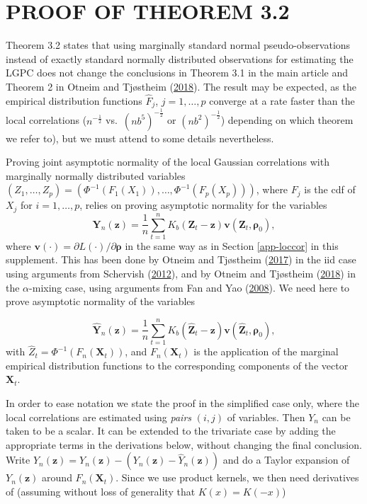 \documentclass[
  12pt,
  letterpaper]{article}
\numberwithin{equation}{section}
\newcommand{\X}{\bm{X}}
\newcommand{\Z}{\bm{Z}}
\newcommand{\z}{\bm{z}}
\newcommand{\hZ}{\widehat{\bm{Z}}}
\newcommand{\hnZ}{\widehat{Z}}
\newcommand{\hY}{\widehat{Y}}
\newcommand{\fY}{\bm{Y}}
\newcommand{\hfY}{\widehat{\bm{Y}}}
\newcommand{\fv}{\bm{v}}
\newcommand{\frho}{\bm{\rho}}
\begin{document}
\hypertarget{proofpseudo}{%
\section{PROOF OF THEOREM 3.2}\label{proofpseudo}}

Theorem 3.2 states that using marginally standard normal pseudo-observations instead of exactly standard normally distributed observations for estimating the LGPC does not change the conclusions in Theorem 3.1 in the main article and Theorem 2 in Otneim and Tjøstheim (\protect\hyperlink{ref-otneim2017conditional}{2018}). The result may be expected, as the empirical distribution functions \(\widehat{F}_j\), \(j = 1,\ldots,p\) converge at a rate faster than the local correlations (\(n^{-\frac{1}{2}}\) vs.~\((nb^5)^{-\frac{1}{2}}\) or \((nb^2)^{-\frac{1}{2}}\)) depending on which theorem we refer to), but we must attend to some details nevertheless.

Proving joint asymptotic normality of the local Gaussian correlations with marginally normally distributed variables \((Z_1, \ldots, Z_p) = \left(\Phi^{-1}(F_1(X_1)), \ldots, \Phi^{-1}(F_p(X_p))\right)\), where \(F_j\) is the cdf of \(X_j\) for \(i = 1,\ldots,p\), relies on proving asymptotic normality for the variables
\[\fY_n(\z) = \frac{1}{n}\sum_{t=1}^nK_b(\Z_t - \z)\fv(\Z_t, \frho_0),\]
where \(\fv(\cdot) = \partial L(\cdot)/\partial\frho\) in the same way as in Section \ref{app-loccor} in this supplement. This has been done by Otneim and Tjøstheim (\protect\hyperlink{ref-otneim2017locally}{2017}) in the iid case using arguments from Schervish (\protect\hyperlink{ref-schervish1995theory}{2012}), and by Otneim and Tjøstheim (\protect\hyperlink{ref-otneim2017conditional}{2018}) in the \(\alpha\)-mixing case, using arguments from Fan and Yao (\protect\hyperlink{ref-fan2008nonlinear}{2008}). We need here to prove asymptotic normality of the variables

\[\hfY_n(\z) = \frac{1}{n}\sum_{t=1}^nK_b(\hZ_t - \z)\fv(\hZ_t,\frho_0),\]
with \(\hnZ_t = \Phi^{-1}(F_n(\X_t))\), and \(F_n(\X_t)\) is the application of the marginal empirical distribution functions to the corresponding components of the vector \(\X_t\).

In order to ease notation we state the proof in the simplified case only, where the local correlations are estimated using \emph{pairs} \((i,j)\) of variables. Then \(Y_n\) can be taken to be a scalar. It can be extended to the trivariate case by adding the appropriate terms in the derivations below, without changing the final conclusion. Write \(\hY_n(\z) = Y_n(\z) - (Y_n(\z) - \hY_n(\z))\) and do a Taylor expansion of \(Y_n(\z)\) around \(F_n(\X_t)\). Since we use product kernels, we then need derivatives of (assuming without loss of generality that \(K(x) = K(-x)\))
\end{document}
